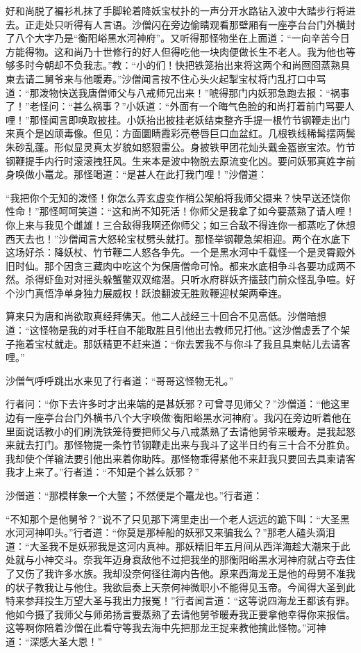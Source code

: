 \documentclass[12pt,UTF8]{ctexbook}
\begin{document}
好和尚脱了褊衫札抹了手脚轮着降妖宝杖扑的一声分开水路钻入波中大踏步行将进去。正走处只听得有人言语。沙僧闪在旁边偷睛观看那壁厢有一座亭台台门外横封了八个大字乃是“衡阳峪黑水河神府”。又听得那怪物坐在上面道：“一向辛苦今日方能得物。这和尚乃十世修行的好人但得吃他一块肉便做长生不老人。我为他也等够多时今朝却不负我志。”教：“小的们！快把铁笼抬出来将这两个和尚囫囵蒸熟具柬去请二舅爷来与他暖寿。”沙僧闻言按不住心头火起掣宝杖将门乱打口中骂道：“那泼物快送我唐僧师父与八戒师兄出来！”唬得那门内妖邪急跑去报：“祸事了！”老怪问：“甚么祸事？”小妖道：“外面有一个晦气色脸的和尚打着前门骂要人哩！”那怪闻言即唤取披挂。小妖抬出披挂老妖结束整齐手提一根竹节钢鞭走出门来真个是凶顽毒像。但见：方面圜睛霞彩亮卷唇巨口血盆红。几根铁线稀髯摆两鬓朱砂乱蓬。形似显灵真太岁貌如怒狠雷公。身披铁甲团花灿头戴金盔嵌宝浓。竹节钢鞭提手内行时滚滚拽狂风。生来本是波中物脱去原流变化凶。要问妖邪真姓字前身唤做小鼍龙。那怪喝道：“是甚人在此打我门哩！”沙僧道：

“我把你个无知的泼怪！你怎么弄玄虚变作梢公架船将我师父摄来？快早送还饶你性命！”那怪呵呵笑道：“这和尚不知死活！你师父是我拿了如今要蒸熟了请人哩！你上来与我见个雌雄！三合敌得我啊还你师父；如三合敌不得连你一都蒸吃了休想西天去也！”沙僧闻言大怒轮宝杖劈头就打。那怪举钢鞭急架相迎。两个在水底下这场好杀：降妖杖、竹节鞭二人怒各争先。一个是黑水河中千载怪一个是灵霄殿外旧时仙。那个因贪三藏肉中吃这个为保唐僧命可怜。都来水底相争斗各要功成两不然。杀得虾鱼对对摇头躲蟹鳖双双缩潜。只听水府群妖齐擂鼓门前众怪乱争喧。好个沙门真悟净单身独力展威权！跃浪翻波无胜败鞭迎杖架两牵连。

算来只为唐和尚欲取真经拜佛天。他二人战经三十回合不见高低。沙僧暗想道：“这怪物是我的对手枉自不能取胜且引他出去教师兄打他。”这沙僧虚丢了个架子拖着宝杖就走。那妖精更不赶来道：“你去罢我不与你斗了我且具柬帖儿去请客哩。”

沙僧气呼呼跳出水来见了行者道：“哥哥这怪物无礼。”

行者问：“你下去许多时才出来端的是甚妖邪？可曾寻见师父？”沙僧道：“他这里边有一座亭台台门外横书八个大字唤做‘衡阳峪黑水河神府’。我闪在旁边听着他在里面说话教小的们刷洗铁笼待要把师父与八戒蒸熟了去请他舅爷来暖寿。是我起怒来就去打门。那怪物提一条竹节钢鞭走出来与我斗了这半日约有三十合不分胜负。我却使个佯输法要引他出来着你助阵。那怪物乖得紧他不来赶我只要回去具柬请客我才上来了。”行者道：“不知是个甚么妖邪？”

沙僧道：“那模样象一个大鳖；不然便是个鼍龙也。”行者道：

“不知那个是他舅爷？”说不了只见那下湾里走出一个老人远远的跪下叫：“大圣黑水河河神叩头。”行者道：“你莫是那棹船的妖邪又来骗我么？”那老人磕头滴泪道：“大圣我不是妖邪我是这河内真神。那妖精旧年五月间从西洋海趁大潮来于此处就与小神交斗。奈我年迈身衰敌他不过把我坐的那衡阳峪黑水河神府就占夺去住了又伤了我许多水族。我却没奈何径往海内告他。原来西海龙王是他的母舅不准我的状子教我让与他住。我欲启奏上天奈何神微职小不能得见玉帝。今闻得大圣到此特来参拜投生万望大圣与我出力报冤！”行者闻言道：“这等说四海龙王都该有罪。他如今摄了我师父与师弟扬言要蒸熟了去请他舅爷暖寿我正要拿他幸得你来报信。这等啊你陪着沙僧在此看守等我去海中先把那龙王捉来教他擒此怪物。”河神道：“深感大圣大恩！”
\end{document}
